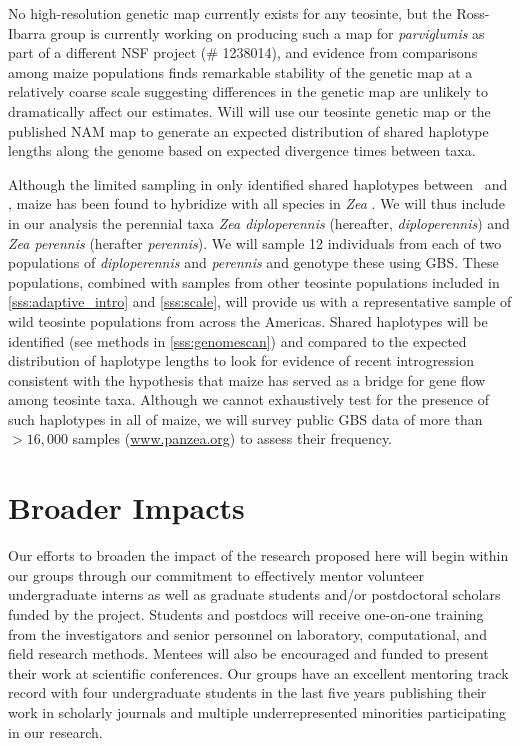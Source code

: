 No high-resolution genetic map currently exists for any teosinte, but the Ross-Ibarra group is currently working on producing such a map for \emph{parviglumis} as part of a different NSF project (\# 1238014), and evidence from comparisons among maize populations finds remarkable stability of the genetic map at a relatively coarse scale \citep{bauer2013} suggesting differences in the genetic map are unlikely to dramatically affect our estimates. 
Will will use our teosinte genetic map or the published NAM map \citep{McMullen2009} to generate an expected distribution of shared haplotype lengths along the genome based on expected divergence times between taxa.

Although the limited sampling in \citet{Ross-Ibarra2009a} only identified shared haplotypes between \zm\ and \zl, maize has been found to hybridize with all species in \emph{Zea} \citep{Wilkes1977}.
We will thus include in our analysis the perennial taxa \emph{Zea diploperennis} (hereafter, \emph{diploperennis}) and \emph{Zea perennis} (herafter \emph{perennis}).  
We will sample 12 individuals from each of two populations of \emph{diploperennis} and \emph{perennis} and genotype these using GBS.
These populations, combined with samples from other teosinte populations included in \ref{sss:adaptive_intro} and \ref{sss:scale}, will provide us with a representative sample of wild teosinte populations from across the Americas.
Shared haplotypes will be identified (see methods in \ref{sss:genomescan}) and compared to the expected distribution of haplotype lengths to look for evidence of recent introgression consistent with the hypothesis that maize has served as a bridge for gene flow among teosinte taxa.
Although we cannot exhaustively test for the presence of such haplotypes in all of maize, we will survey public GBS data of more than $>16,000$  samples (\url{www.panzea.org}) to assess their frequency.

\section*{Broader Impacts}

Our efforts to broaden the impact of the research proposed here will begin within our groups through our commitment to effectively mentor volunteer undergraduate interns as well as graduate students and/or postdoctoral scholars funded by the project. Students and postdocs will receive one-on-one training from the investigators and senior personnel on laboratory, computational, and field research methods.  Mentees will also be encouraged and funded to present their work at scientific conferences.  Our groups have an excellent mentoring track record with four undergraduate students in the last five years publishing their work in scholarly journals and multiple underrepresented minorities participating in our research.

